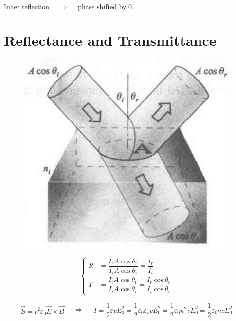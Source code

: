 Inner reflection $\quad \Rightarrow \quad $ phase shifted by $0$.

\section{Reflectance and Transmittance}

\begin{figure}[H]
  \centering
  \includegraphics[width=0.4\linewidth]{figures/Reflectance-and-Transmittance}
\end{figure}

\begin{equation*}
  \left\{
  \begin{aligned}
    R &= \dfrac{I_r A \cos \theta_r}{I_i A \cos \theta_i} = \dfrac{I_r}{I_i} \\
    T &= \dfrac{I_t A \cos \theta_t}{I_i A \cos \theta_i} = \dfrac{I_t \cos \theta_t}{I_i \cos \theta_i}
  \end{aligned}
  \right.
\end{equation*}

\begin{equation*}
  \begin{aligned}
    \vec{S} = c^2 \varepsilon_0 \vec{E} \times \vec{B}
  \end{aligned}
  \quad \Rightarrow \quad
  \begin{aligned}
    I = \dfrac{1}{2} \varepsilon v E_0^2 = \dfrac{1}{2} \varepsilon_0 \varepsilon_r v E_0^2 = \dfrac{1}{2} \varepsilon_0 n^2 v E_0^2 = \dfrac{1}{2} \varepsilon_0 n c E_0^2
  \end{aligned}
\end{equation*}

